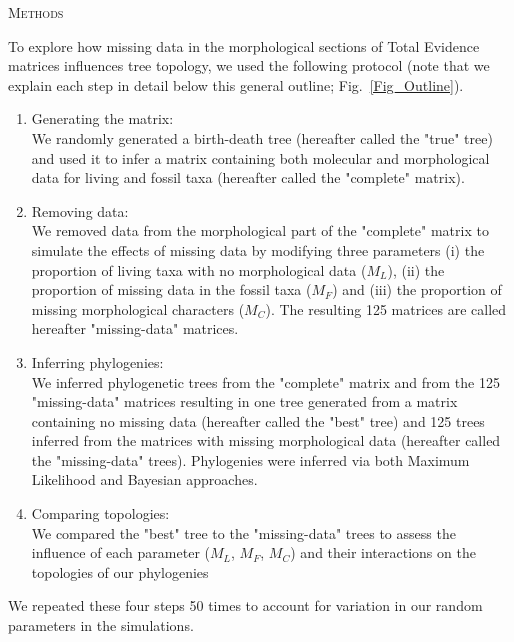\documentclass[12pt,letterpaper]{article}
\renewcommand{\section}[1]{%
\bigskip
\begin{center}
\begin{Large}
\normalfont\scshape #1
\medskip
\end{Large}
\end{center}}
\begin{document}
\section{Methods}
To explore how missing data in the morphological sections of Total Evidence matrices influences tree topology, we used the following protocol (note that we explain each step in detail below this general outline; Fig.~\ref{Fig_Outline}).
\begin{enumerate}
\item{Generating the matrix:} \label{step:generate_matrix} \\
We randomly generated a birth-death tree (hereafter called the "true" tree) and used it to infer a matrix containing both molecular and morphological data for living and fossil taxa (hereafter called the "complete" matrix).
\item{Removing data:} \label{step:remove_data} \\
We removed data from the morphological part of the "complete" matrix to simulate the effects of missing data by modifying three parameters (i) the proportion of living taxa with no morphological data ($M_{L}$), (ii) the proportion of missing data in the fossil taxa ($M_{F}$) and (iii) the proportion of missing morphological characters ($M_{C}$). The resulting 125 matrices are called hereafter "missing-data" matrices.
\item{Inferring phylogenies:} \label{step:build_phylo} \\
We inferred phylogenetic trees from the "complete" matrix and from the 125 "missing-data" matrices resulting in one tree generated from a matrix containing no missing data (hereafter called the "best" tree) and 125 trees inferred from the matrices with missing morphological data (hereafter called the "missing-data" trees). Phylogenies were inferred via both Maximum Likelihood and Bayesian approaches.
\item{Comparing topologies:} \label{step:compare_topo} \\
We compared the "best" tree to the "missing-data" trees to assess the influence of each parameter ($M_{L}$, $M_{F}$, $M_{C}$) and their interactions on the topologies of our phylogenies
\end{enumerate}
We repeated these four steps 50 times to account for variation in our random parameters in the simulations.
\end{document}
